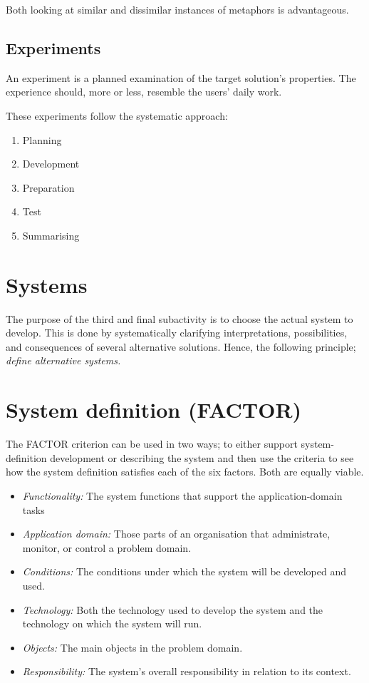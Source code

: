 Both looking at similar and dissimilar instances of metaphors is advantageous.

\subsection{Experiments}
An experiment is a planned examination of the target solution's properties. The experience should, more or less, resemble the users' daily work.

These experiments follow the systematic approach:

\begin{enumerate}
    \item Planning
    \item Development
    \item Preparation
    \item Test
    \item Summarising
\end{enumerate}

\section{Systems}
The purpose of the third and final subactivity is to choose the actual system to develop. This is done by systematically clarifying interpretations, possibilities, and consequences of several alternative solutions. Hence, the following principle; \textit{define alternative systems.}

\section{System definition (FACTOR)}
The FACTOR criterion can be used in two ways; to either support system-definition development or describing the system and then use the criteria to see how the system definition satisfies each of the six factors. Both are equally viable.

\begin{itemize}
    \item[] \textit{Functionality:} The system functions that support the application-domain tasks
    \item[] \textit{Application domain:} Those parts of an organisation that administrate, monitor, or control a problem domain.
    \item[] \textit{Conditions:} The conditions under which the system will be developed and used.
    \item[] \textit{Technology:} Both the technology used to develop the system and the technology on which the system will run.
    \item[] \textit{Objects:} The main objects in the problem domain.
    \item[] \textit{Responsibility:} The system's overall responsibility in relation to its context.
\end{itemize}

